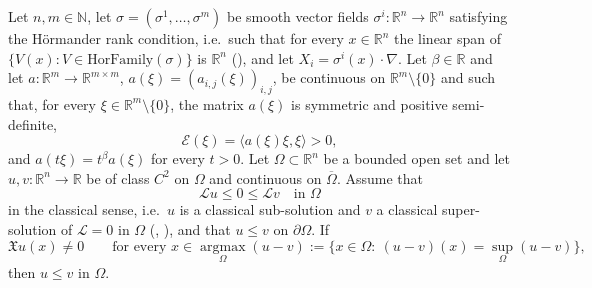 \begin{theorem}
Let $n,m\in\mathbb{N}$, let $\sigma=(\sigma^1,\dots,\sigma^m)$ be smooth vector fields
$\sigma^i:\mathbb{R}^n\to\mathbb{R}^n$ satisfying the H\"ormander rank condition, i.e.\ such that
for every $x\in\mathbb{R}^n$ the linear span of $\{V(x):V\in\mathrm{HorFamily}(\sigma)\}$ is
$\mathbb{R}^n$ (), and let $X_i=\sigma^i(x)\cdot\nabla$. Let
$\beta\in\mathbb{R}$ and let $a:\mathbb{R}^m\to\mathbb{R}^{m\times m}$,
$a(\xi)=(a_{i,j}(\xi))_{i,j}$, be continuous on $\mathbb{R}^m\setminus\{0\}$ and such that, for
every $\xi\in\mathbb{R}^m\setminus\{0\}$, the matrix $a(\xi)$ is symmetric and positive
semi-definite,
$$\mathcal{E}(\xi)=\big\langle a(\xi)\xi,\xi\big\rangle>0,$$
and $a(t\xi)=t^\beta a(\xi)$ for every $t>0$. Let $\Omega\subset\mathbb{R}^n$ be a bounded open
set and let $u,v:\mathbb{R}^n\to\mathbb{R}$ be of class $C^2$ on $\Omega$ and continuous on
$\overline\Omega$. Assume that
$$\mathcal{L}u\leq0\leq\mathcal{L}v\quad\text{in }\Omega$$
in the classical sense, i.e.\ $u$ is a classical sub-solution and $v$ a classical super-solution of
$\mathcal{L}=0$ in $\Omega$ (, ), and that
$u\leq v$ on $\partial\Omega$. If
$$\mathfrak{X}u(x)\neq0\qquad\text{for every }x\in\operatorname*{argmax}_\Omega(u-v)
:=\Big\{x\in\Omega:\ (u-v)(x)=\sup_\Omega(u-v)\Big\},$$
then $u\leq v$ in $\Omega$.
\end{theorem}
